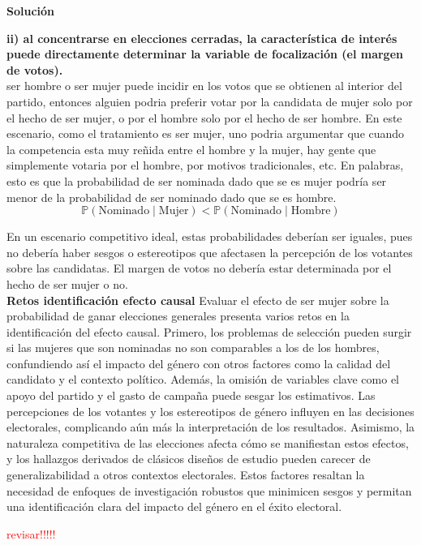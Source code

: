 \documentclass[a4paper, answers, addpoints, 11pt]{exam}
\newenvironment{solucion}{%
  \begin{mdframed}[
    backgroundcolor=blue!5,    %
    linecolor=blue!50,          %
    linewidth=2pt,              %
    leftmargin=10pt,            %
    rightmargin=8pt,           %
    topline=true,              %
    bottomline=true,            %
    roundcorner=10pt,           %
    innerleftmargin=10pt,       %
    innerrightmargin=10pt,      %
    innerbottommargin=10pt,     %
    innertopmargin=10pt         %
  ]%
  \begin{tcolorbox}[colframe=blue!50!black, colback=blue!50, coltitle=white, sharp corners=all, boxrule=1mm, width=\textwidth, halign=left, valign=center, top=0mm, bottom=0mm, left=0mm, right=0mm] \textbf{Solución} \end{tcolorbox} }{\end{mdframed}}
\begin{document}
\begin{enumerate}[resume]
\begin{solucion}
\textbf{ii) al concentrarse en elecciones cerradas, la característica de interés puede directamente
determinar la variable de focalización (el margen de votos).}\\
ser hombre o ser mujer puede incidir en los votos que se obtienen al interior del partido, entonces alguien podria preferir votar por la candidata de mujer solo por el hecho de ser mujer, o por el hombre solo por el hecho de ser hombre. En este escenario, como el tratamiento es ser mujer, uno podria argumentar que cuando la competencia esta muy reñida entre el hombre y la mujer, hay gente que simplemente votaria por el hombre, por motivos tradicionales, etc. En palabras, esto es que la probabilidad de ser nominada dado que se es mujer podría ser menor de la probabilidad de ser nominado dado que se es hombre.  \[
    \mathbb{P}(\text{Nominado} \mid \text{Mujer}) < \mathbb{P}(\text{Nominado} \mid \text{Hombre})
    \]

En un escenario competitivo ideal, estas probabilidades deberían ser iguales, pues no debería haber sesgos o estereotipos que afectasen la percepción de los votantes sobre las candidatas.  El margen de votos no debería estar determinada por el hecho de ser mujer o no.\\ 


\textbf{Retos identificación efecto causal}
 Evaluar el efecto de ser mujer sobre la probabilidad de ganar elecciones generales presenta varios retos en la identificación del efecto causal. Primero, los problemas de selección pueden surgir si las mujeres que son nominadas  no son comparables a los de los hombres, confundiendo así el impacto del género con otros factores como la calidad del candidato y el contexto político. Además, la omisión de variables clave como el apoyo del partido y el gasto de campaña puede sesgar los estimativos. Las percepciones de los votantes y los estereotipos de género influyen en las decisiones electorales, complicando aún más la interpretación de los resultados. Asimismo, la naturaleza competitiva de las elecciones afecta cómo se manifiestan estos efectos, y los hallazgos derivados de clásicos diseños de estudio pueden carecer de generalizabilidad a otros contextos electorales. Estos factores resaltan la necesidad de enfoques de investigación robustos que minimicen sesgos y permitan una identificación clara del impacto del género en el éxito electoral.
 
\textcolor{red}{revisar!!!!!}      
\end{solucion}
\end{enumerate}
\end{document}
